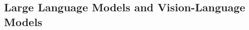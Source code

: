 \documentclass[11pt]{article}
\begin{document}












\subsection{Large Language Models and Vision-Language Models}
\end{document}
